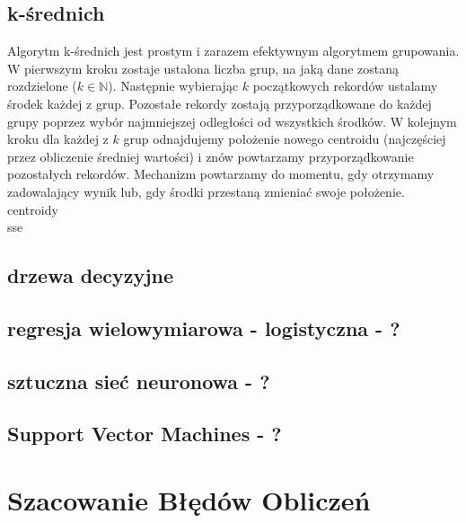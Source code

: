 \documentclass[12pt,a4paper]{report}
\begin{document}
\subsection{k-średnich}%
Algorytm k-średnich jest prostym i zarazem efektywnym algorytmem grupowania.
\\W pierwszym kroku zostaje ustalona liczba grup, na jaką dane zostaną rozdzielone ($k \in \mathbb{N}$). Następnie wybierając $k$ początkowych rekordów ustalamy środek każdej z grup. Pozostałe rekordy zostają przyporządkowane do każdej grupy poprzez wybór najmniejszej odległości od wszystkich środków. W kolejnym kroku dla każdej z $k$ grup odnajdujemy położenie nowego centroidu (najczęściej przez obliczenie średniej wartości) i znów powtarzamy przyporządkowanie pozostałych rekordów. Mechanizm powtarzamy do momentu, gdy otrzymamy zadowalający wynik lub, gdy środki przestaną zmieniać swoje położenie.
 \\centroidy
 \\sse
\subsection{drzewa decyzyjne}
\subsection{regresja wielowymiarowa - logistyczna - ?}
\subsection{sztuczna sieć neuronowa - ?}
\subsection{Support Vector Machines - ?}
\section{Szacowanie Błędów Obliczeń}
\end{document}
